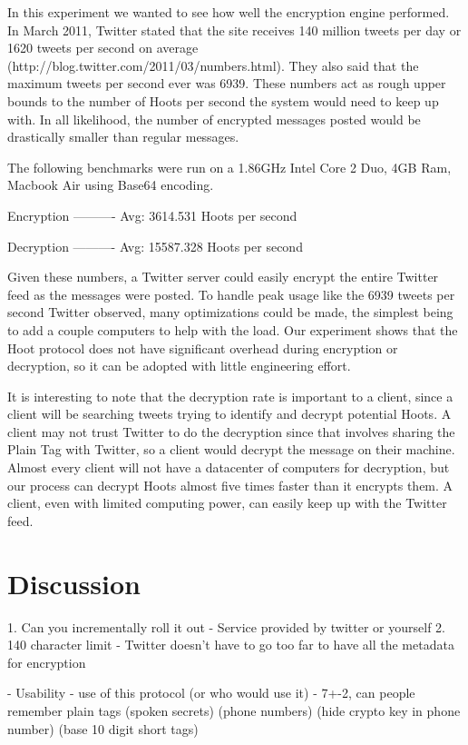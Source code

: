 \documentclass{acm_proc_article-sp}
\begin{document}
In this experiment we wanted to see how well the encryption engine performed. In March 2011, Twitter stated that the site receives 140 million tweets per day or 1620 tweets per second on average (http://blog.twitter.com/2011/03/numbers.html). They also said that the maximum tweets per second ever was 6939. These numbers act as rough upper bounds to the number of Hoots per second the system would need to keep up with. In all likelihood, the number of encrypted messages posted would be drastically smaller than regular messages.

The following benchmarks were run on a 1.86GHz Intel Core 2 Duo, 4GB Ram, Macbook Air using Base64 encoding. 

Encryption
----------
Avg: 3614.531 Hoots per second

Decryption
----------
Avg: 15587.328 Hoots per second

Given these numbers, a Twitter server could easily encrypt the entire Twitter feed as the messages were posted. To handle peak usage like the 6939 tweets per second Twitter observed, many optimizations could be made, the simplest being to add a couple computers to help with the load. Our experiment shows that the Hoot protocol does not have significant overhead during encryption or decryption, so it can be adopted with little engineering effort.

It is interesting to note that the decryption rate is important to a client, since a client will be searching tweets trying to identify and decrypt potential Hoots. A client may not trust Twitter to do the decryption since that involves sharing the Plain Tag with Twitter, so a client would decrypt the message on their machine. Almost every client will not have a datacenter of computers for decryption, but our  process can decrypt Hoots almost five times faster than it encrypts them. A client, even with limited computing power, can easily keep up with the Twitter feed.

\section{Discussion}
1. Can you incrementally roll it out
	- Service provided by twitter or yourself
2. 140 character limit
	- Twitter doesn't have to go too far to have all the metadata for encryption



- Usability
	- use of this protocol (or who would use it)
	- 7+-2, can people remember plain tags (spoken secrets) (phone numbers) (hide crypto key in phone number) (base 10 digit short tags)
	
\end{document}
